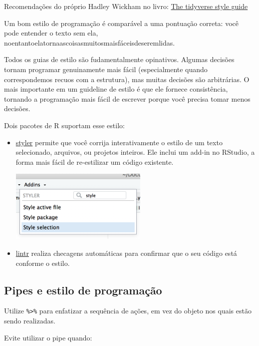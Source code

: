 \documentclass[
]{book}
\begin{document}
Recomendações do próprio Hadley Wickham no livro: \href{https://style.tidyverse.org/pipes.html}{The tidyverse style guide}

Um bom estilo de programação é comparável a uma pontuação correta: você pode
entender o texto sem ela,
noentantoelatornaascoisasmuitosmaisfáceisdeseremlidas.

Todos os guias de estilo são fudamentalmente opinativos. Algumas decisões
tornam programar genuinamente mais fácil (especialmente quando correspondemos
recuos com a estrutura), mas muitas decisões são arbitrárias. O mais importante
em um guideline de estilo é que ele fornece consistência, tornando a
programação mais fácil de escrever porque você precisa tomar menos decisões.

Dois pacotes de R suportam esse estilo:

\begin{itemize}
\item
  \href{http://styler.r-lib.org}{styler} permite que você corrija
  interativamente o estilo de um texto selecionado, arquivos, ou projetos
  inteiros. Ele inclui um add-in no RStudio, a forma mais fácil de
  re-estilizar um código existente.

  \begin{center}\includegraphics[width=2.6in]{figuras/styler-addin} \end{center}
\item
  \href{https://github.com/jimhester/lintr}{lintr} realiza checagens
  automáticas para confirmar que o seu código está conforme o estilo.
\end{itemize}

\hypertarget{pipes-e-estilo-de-programauxe7uxe3o}{%
\subsection{Pipes e estilo de programação}\label{pipes-e-estilo-de-programauxe7uxe3o}}

Utilize \texttt{\%\textgreater{}\%} para enfatizar a sequência de ações, em vez do objeto nos quais estão sendo realizadas.

Evite utilizar o pipe quando:
\end{document}

